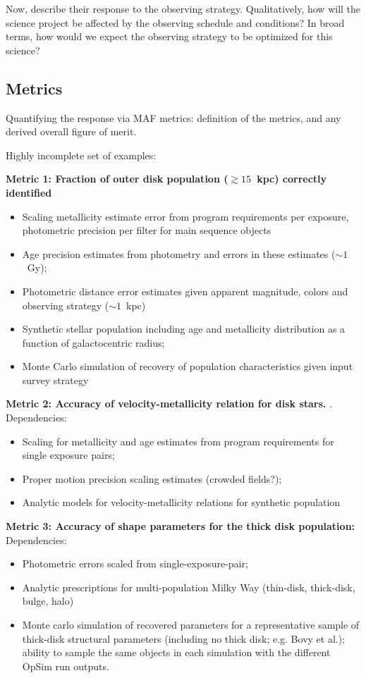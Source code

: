 Now, describe their response to the observing strategy. Qualitatively,
how will the science project be affected by the observing schedule and
conditions? In broad terms, how would we expect the observing strategy
to be optimized for this science?



\subsection{Metrics}
\label{sec:\secname:metrics}

Quantifying the response via MAF metrics: definition of the metrics,
and any derived overall figure of merit.

Highly incomplete set of examples:

{\bf Metric 1: Fraction of outer disk population ($\gtrsim 15$~kpc) correctly identified}
\begin{itemize}
  \item Scaling metallicity estimate error from program requirements per exposure, photometric precision per filter for main sequence objects
    \item Age precision estimates from photometry and errors in these estimates ($\sim 1$~Gy);
      \item Photometric distance error estimates given apparent magnitude, colors and observing strategy ($\sim 1$~kpc)
        \item Synthetic stellar population including age and metallicity distribution as a function of galactocentric radius;
          \item Monte Carlo simulation of recovery of population
            characteristics given input survey strategy
\end{itemize}

{\bf Metric 2: Accuracy of velocity-metallicity relation for disk stars.}
\citep[e.g.,][]{2011ApJ...737....8L}. Dependencies:
\begin{itemize}
  \item Scaling for metallicity and age estimates from program requirements for single exposure pairs;
    \item Proper motion precision scaling estimates (crowded fields?); 
  \item Analytic models for velocity-metallicity relations for synthetic population
\end{itemize} 

{\bf Metric 3: Accuracy of shape parameters for the thick disk population:} Dependencies:
\begin{itemize}
  \item Photometric errors scaled from single-exposure-pair;
    \item Analytic prescriptions for multi-population Milky Way (thin-disk, thick-disk, bulge, halo)
      \item Monte carlo simulation of recovered parameters for a representative sample of thick-disk structural parameters (including no thick disk; e.g. Bovy et al.); ability to sample the same objects in each simulation with the different OpSim run outputs. 
\end{itemize}

